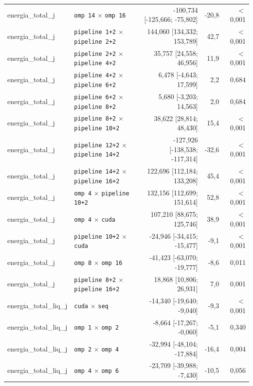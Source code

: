 \begin{tabular}{llrrr}
energia\_total\_j & \texttt{omp 14} $\times$ \texttt{omp 16} & -100,734 [-125,666; -75,802] & -20,8 & $<$0,001 \\
energia\_total\_j & \texttt{pipeline 1+2} $\times$ \texttt{pipeline 2+2} & 144,060 [134,332; 153,789] & 42,7 & $<$0,001 \\
energia\_total\_j & \texttt{pipeline 2+2} $\times$ \texttt{pipeline 4+2} & 35,757 [24,558; 46,956] & 11,9 & $<$0,001 \\
energia\_total\_j & \texttt{pipeline 4+2} $\times$ \texttt{pipeline 6+2} & 6,478 [-4,643; 17,599] & 2,2 & 0,684 \\
energia\_total\_j & \texttt{pipeline 6+2} $\times$ \texttt{pipeline 8+2} & 5,680 [-3,203; 14,563] & 2,0 & 0,684 \\
energia\_total\_j & \texttt{pipeline 8+2} $\times$ \texttt{pipeline 10+2} & 38,622 [28,814; 48,430] & 15,4 & $<$0,001 \\
energia\_total\_j & \texttt{pipeline 12+2} $\times$ \texttt{pipeline 14+2} & -127,926 [-138,538; -117,314] & -32,6 & $<$0,001 \\
energia\_total\_j & \texttt{pipeline 14+2} $\times$ \texttt{pipeline 16+2} & 122,696 [112,184; 133,208] & 45,4 & $<$0,001 \\
energia\_total\_j & \texttt{omp 4} $\times$ \texttt{pipeline 10+2} & 132,156 [112,699; 151,614] & 52,8 & $<$0,001 \\
energia\_total\_j & \texttt{omp 4} $\times$ \texttt{cuda} & 107,210 [88,675; 125,746] & 38,9 & $<$0,001 \\
energia\_total\_j & \texttt{pipeline 10+2} $\times$ \texttt{cuda} & -24,946 [-34,415; -15,477] & -9,1 & $<$0,001 \\
energia\_total\_j & \texttt{omp 8} $\times$ \texttt{omp 16} & -41,423 [-63,070; -19,777] & -8,6 & 0,011 \\
energia\_total\_j & \texttt{pipeline 8+2} $\times$ \texttt{pipeline 16+2} & 18,868 [10,806; 26,931] & 7,0 & 0,001 \\
energia\_total\_liq\_j & \texttt{cuda} $\times$ \texttt{seq} & -14,340 [-19,640; -9,040] & -9,3 & $<$0,001 \\
energia\_total\_liq\_j & \texttt{omp 1} $\times$ \texttt{omp 2} & -8,664 [-17,267; -0,060] & -5,1 & 0,340 \\
energia\_total\_liq\_j & \texttt{omp 2} $\times$ \texttt{omp 4} & -32,994 [-48,104; -17,884] & -16,4 & 0,004 \\
energia\_total\_liq\_j & \texttt{omp 4} $\times$ \texttt{omp 6} & -23,709 [-39,988; -7,430] & -10,5 & 0,056 \\

\end{tabular}

